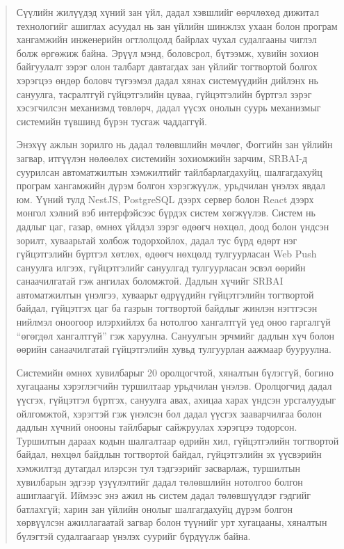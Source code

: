 \begin{abstract}
Сүүлийн жилүүдэд хүний зан үйл, дадал хэвшлийг өөрчлөхөд дижитал технологийг ашиглах асуудал нь зан үйлийн шинжлэх ухаан болон програм хангамжийн инженерийн огтлолцолд байрлах чухал судалгааны чиглэл болж өргөжиж байна. Эрүүл мэнд, боловсрол, бүтээмж, хувийн зохион байгуулалт зэрэг олон талбарт давтагдах зан үйлийг тогтвортой болгох хэрэгцээ өндөр боловч түгээмэл дадал хянах системүүдийн дийлэнх нь сануулга, тасралтгүй гүйцэтгэлийн цуваа, гүйцэтгэлийн бүртгэл зэрэг хэсэгчилсэн механизмд төвлөрч, дадал үүсэх онолын суурь механизмыг системийн түвшинд бүрэн тусгаж чаддаггүй.

Энэхүү ажлын зорилго нь дадал төлөвшлийн мөчлөг, Фоггийн зан үйлийн загвар, итгүүлэн нөлөөлөх системийн зохиомжийн зарчим, SRBAI-д суурилсан автоматжилтын хэмжилтийг тайлбарлагдахуйц, шалгагдахуйц програм хангамжийн дүрэм болгон хэрэгжүүлж, урьдчилан үнэлэх явдал юм. Үүний тулд NestJS, PostgreSQL дээрх сервер болон React дээрх монгол хэлний вэб интерфэйсээс бүрдэх систем хөгжүүлэв. Систем нь дадлыг цаг, газар, өмнөх үйлдэл зэрэг өдөөгч нөхцөл, доод болон үндсэн зорилт, хуваарьтай холбож тодорхойлох, дадал тус бүрд өдөрт нэг гүйцэтгэлийн бүртгэл хөтлөх, өдөөгч нөхцөлд тулгуурласан Web Push сануулга илгээх, гүйцэтгэлийг сануулгад тулгуурласан эсвэл өөрийн санаачилгатай гэж ангилах боломжтой. Дадлын хүчийг SRBAI автоматжилтын үнэлгээ, хуваарьт өдрүүдийн гүйцэтгэлийн тогтвортой байдал, гүйцэтгэх цаг ба газрын тогтвортой байдлыг жинлэн нэгтгэсэн нийлмэл оноогоор илэрхийлэх ба нотолгоо хангалтгүй үед оноо гаргалгүй ``өгөгдөл хангалтгүй'' гэж харуулна. Сануулгын эрчмийг дадлын хүч болон өөрийн санаачилгатай гүйцэтгэлийн хувьд тулгуурлан аажмаар бууруулна.

Системийн өмнөх хувилбарыг 20 оролцогчтой, хяналтын бүлэггүй, богино хугацааны хэрэглэгчийн туршилтаар урьдчилан үнэлэв. Оролцогчид дадал үүсгэх, гүйцэтгэл бүртгэх, сануулга авах, ахицаа харах үндсэн урсгалуудыг ойлгомжтой, хэрэгтэй гэж үнэлсэн бол дадал үүсгэх зааварчилгаа болон дадлын хүчний онооны тайлбарыг сайжруулах хэрэгцээ тодорсон. Туршилтын дараах кодын шалгалтаар өдрийн хил, гүйцэтгэлийн тогтвортой байдал, нөхцөл байдлын тогтвортой байдал, гүйцэтгэлийн эх үүсвэрийн хэмжилтэд дутагдал илэрсэн тул тэдгээрийг засварлаж, туршилтын хувилбарын эдгээр үзүүлэлтийг дадал төлөвшлийн нотолгоо болгон ашиглаагүй. Иймээс энэ ажил нь систем дадал төлөвшүүлдэг гэдгийг батлахгүй; харин зан үйлийн онолыг шалгагдахуйц дүрэм болгон хөрвүүлсэн ажиллагаатай загвар болон түүнийг урт хугацааны, хяналтын бүлэгтэй судалгаагаар үнэлэх суурийг бүрдүүлж байна.
\end{abstract}
